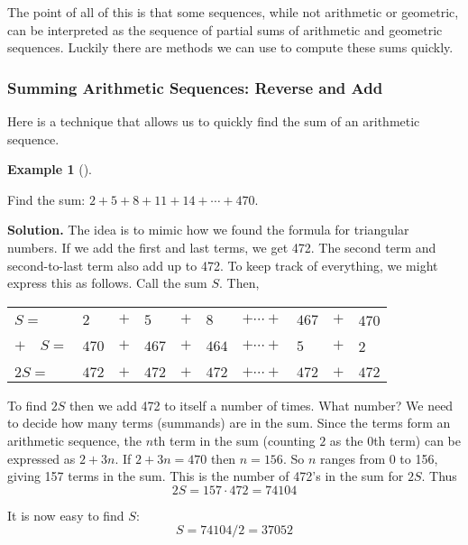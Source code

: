 \documentclass[10pt,]{book}
\theoremstyle{plain}
\theoremstyle{definition}
\newtheorem{example}[theorem]{Example}
\theoremstyle{definition}
\theoremstyle{definition}
\numberwithin{equation}{chapter}
\newcommand{\hrulethin}  {\noalign{\hrule height 0.04em}}
\begin{document}
        The point of all of this is that some sequences, while not arithmetic or geometric, can be interpreted as the sequence of partial sums of arithmetic and geometric sequences. Luckily there are methods we can use to compute these sums quickly.
\typeout{************************************************}
\typeout{************************************************}
\subsubsection[Summing Arithmetic Sequences: Reverse and Add]{Summing Arithmetic Sequences: Reverse and Add}\label{subsubsection-1}

        Here is a technique that allows us to quickly find the sum of an arithmetic sequence.
\begin{example}[]\label{example-63}

            Find the sum: \(2 + 5 + 8 + 11 + 14 + \cdots + 470\).
\par\medskip\noindent%
\textbf{Solution.}\quad
            The idea is to mimic how we found the formula for triangular numbers. If we add the first and last terms, we get 472. The second term and second-to-last term also add up to 472. To keep track of everything, we might express this as follows. Call the sum \(S\). Then,
\leavevmode%
\begin{table}
\centering
\begin{tabular}{llllllllll}
\(S  =\)&\(2\)&\(+\)&\(5\)&\(+\)&\(8\)&\(+ \cdots +\)&\(467\)&\(+\)&470\tabularnewline[0pt]
\(+ \quad S  =\)&\(470\)&\(+\)&\(467\)&\(+\)&\(464\)&\(+ \cdots +\)&\(5\)&\(+\)&2\tabularnewline[0pt]
&&&&&&&&&\tabularnewline\hrulethin
\(2S  =\)&\(472\)&\(+\)&\(472\)&\(+\)&\(472\)&\(+ \cdots +\)&\(472\)&\(+\)&\(472\)\tabularnewline[0pt]

\end{tabular}
\end{table}
\par

            To find \(2S\) then we add 472 to itself a number of times. What number? We need to decide how many terms (summands) are in the sum. Since the terms form an arithmetic sequence, the \(n\)th term in the sum (counting \(2\) as the 0th term) can be expressed as \(2 + 3n\). If \(2 + 3n = 470\) then \(n = 156\). So \(n\) ranges from 0 to 156, giving 157 terms in the sum. This is the number of 472's in the sum for \(2S\). Thus
            \begin{equation*}
              2S = 157\cdot 472 = 74104
            \end{equation*}
\par

            It is now easy to find \(S\):
            \begin{equation*}
              S = 74104/2 = 37052
            \end{equation*}
\end{example}
\par
\end{document}
